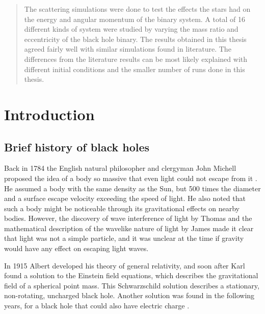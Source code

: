 \documentclass[english, oneside]{HYgradu}
\begin{document}
\begin{abstract}
The scattering simulations were done to test the effects the stars had on the energy and angular momentum of the binary system. A total of 16 different kinds of system were studied by varying the mass ratio and eccentricity of the black hole binary. The results obtained in this thesis agreed fairly well with similar simulations found in literature. The differences from the literature results can be most likely explained with different initial conditions and the smaller number of runs done in this thesis.
\end{abstract}

\mytableofcontents


\setlength{\parindent}{.75cm}
\setlength{\parskip}{.6cm}
\chapter{Introduction}


\section{Brief history of black holes}

Back in 1784 the English natural philosopher and clergyman John Michell proposed the idea of a body so massive that even light could not escape from it \citep{michell:1784}. He assumed a body with the same density as the Sun, but 500 times the diameter and a surface escape velocity exceeding the speed of light. He also noted that such a body might be noticeable through its gravitational effects on nearby bodies. However, the discovery of wave interference of light by Thomas \cite{young:1804} and the mathematical description of the wavelike nature of light by James \cite{maxwell} made it clear that light was not a simple particle, and it was unclear at the time if gravity would have any effect on escaping light waves.

In 1915 Albert \citeauthor{einstein:1915} developed his theory of general relativity, and soon after Karl \cite{schwarzschild:1916} found a solution to the Einstein field equations, which describes the gravitational field of a spherical point mass. This Schwarzschild solution describes a stationary, non-rotating, uncharged black hole. Another solution was found in the following years, for a black hole that could also have electric charge \citep{reissner:1916, nordstrom:1918}.
\end{document}
